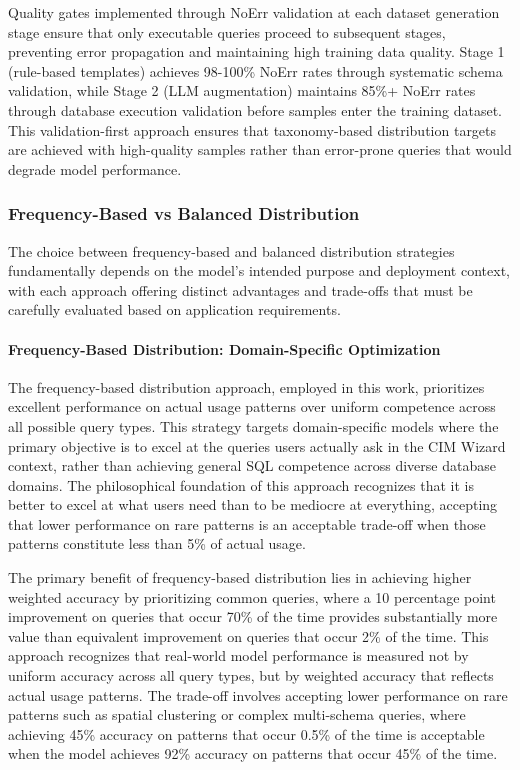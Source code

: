Quality gates implemented through NoErr validation at each dataset generation stage ensure that only executable queries proceed to subsequent stages, preventing error propagation and maintaining high training data quality. Stage 1 (rule-based templates) achieves 98-100\% NoErr rates through systematic schema validation, while Stage 2 (LLM augmentation) maintains 85\%+ NoErr rates through database execution validation before samples enter the training dataset. This validation-first approach ensures that taxonomy-based distribution targets are achieved with high-quality samples rather than error-prone queries that would degrade model performance.

\subsubsection{Frequency-Based vs Balanced Distribution}

The choice between frequency-based and balanced distribution strategies fundamentally depends on the model's intended purpose and deployment context, with each approach offering distinct advantages and trade-offs that must be carefully evaluated based on application requirements.

\paragraph{Frequency-Based Distribution: Domain-Specific Optimization}

The frequency-based distribution approach, employed in this work, prioritizes excellent performance on actual usage patterns over uniform competence across all possible query types. This strategy targets domain-specific models where the primary objective is to excel at the queries users actually ask in the CIM Wizard context, rather than achieving general SQL competence across diverse database domains. The philosophical foundation of this approach recognizes that it is better to excel at what users need than to be mediocre at everything, accepting that lower performance on rare patterns is an acceptable trade-off when those patterns constitute less than 5\% of actual usage.

The primary benefit of frequency-based distribution lies in achieving higher weighted accuracy by prioritizing common queries, where a 10 percentage point improvement on queries that occur 70\% of the time provides substantially more value than equivalent improvement on queries that occur 2\% of the time. This approach recognizes that real-world model performance is measured not by uniform accuracy across all query types, but by weighted accuracy that reflects actual usage patterns. The trade-off involves accepting lower performance on rare patterns such as spatial clustering or complex multi-schema queries, where achieving 45\% accuracy on patterns that occur 0.5\% of the time is acceptable when the model achieves 92\% accuracy on patterns that occur 45\% of the time.

